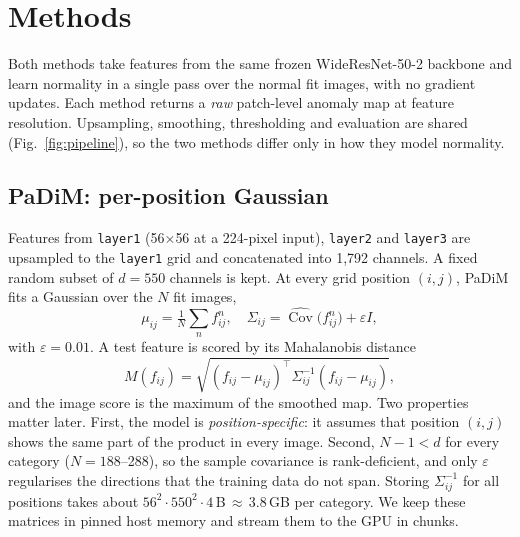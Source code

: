 \section{Methods}
\label{sec:method}

Both methods take features from the same frozen WideResNet-50-2 backbone and learn normality in a single pass over the normal fit images, with no gradient updates.
Each method returns a \emph{raw} patch-level anomaly map at feature resolution.
Upsampling, smoothing, thresholding and evaluation are shared (Fig.~\ref{fig:pipeline}), so the two methods differ only in how they model normality.


\subsection{PaDiM: per-position Gaussian}
Features from \texttt{layer1} (56$\times$56 at a 224-pixel input), \texttt{layer2} and \texttt{layer3} are upsampled to the \texttt{layer1} grid and concatenated into 1{,}792 channels.
A fixed random subset of $d=550$ channels is kept.
At every grid position $(i,j)$, PaDiM fits a Gaussian over the $N$ fit images,
\begin{equation}
  \mu_{ij}=\tfrac{1}{N}\textstyle\sum_n f^{n}_{ij},\quad
  \Sigma_{ij}=\widehat{\operatorname{Cov}}\big(f^{n}_{ij}\big)+\varepsilon I,
\end{equation}
with $\varepsilon=0.01$.
A test feature is scored by its Mahalanobis distance
\begin{equation}
  M(f_{ij})=\sqrt{(f_{ij}-\mu_{ij})^{\top}\Sigma_{ij}^{-1}(f_{ij}-\mu_{ij})},
\end{equation}
and the image score is the maximum of the smoothed map.
Two properties matter later.
First, the model is \emph{position-specific}: it assumes that position $(i,j)$ shows the same part of the product in every image.
Second, $N-1<d$ for every category ($N=188$--288), so the sample covariance is rank-deficient, and only $\varepsilon$ regularises the directions that the training data do not span.
Storing $\Sigma_{ij}^{-1}$ for all positions takes about $56^2\cdot550^2\cdot4$\,B\,$\approx$\,3.8\,GB per category.
We keep these matrices in pinned host memory and stream them to the GPU in chunks.

